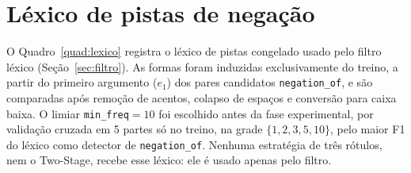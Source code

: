 \chapter[Léxico de pistas de negação]{Léxico de pistas de negação}
\label{ap:lexico}

O Quadro~\ref{quad:lexico} registra o léxico de pistas congelado usado pelo filtro
léxico (Seção~\ref{sec:filtro}). As formas foram induzidas exclusivamente do treino,
a partir do primeiro argumento ($e_1$) dos pares candidatos \texttt{negation\_of}, e
são comparadas após remoção de acentos, colapso de espaços e conversão para caixa
baixa. O limiar \texttt{min\_freq}$=10$ foi escolhido antes da fase experimental, por
validação cruzada em 5 partes só no treino, na grade $\{1, 2, 3, 5, 10\}$, pelo
maior F1 do léxico como detector de \texttt{negation\_of}. Nenhuma
estratégia de três rótulos, nem o Two-Stage, recebe esse léxico: ele é usado apenas
pelo filtro.


